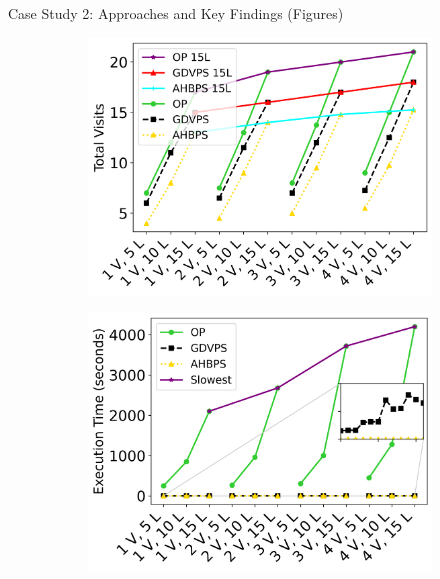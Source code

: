 \documentclass{beamer}
\begin{document}
\begin{frame}{Case Study 2: Approaches and Key Findings (Figures)}
    \begin{figure}[t]
    \centering
    \begin{subfigure}{0.315\textwidth}
        \centering
        \includegraphics[width=\textwidth]{figs/all_acc.png}
        \caption{}
    \end{subfigure}
    \hfill
    \begin{subfigure}{0.315\textwidth}
        \centering
        \includegraphics[width=\textwidth]{figs/all_exec.png}
        \caption{}
    \end{subfigure}
    \hfill
    \begin{subfigure}{0.315\textwidth}

\end{subfigure}
\end{figure}
\end{frame}
\end{document}
